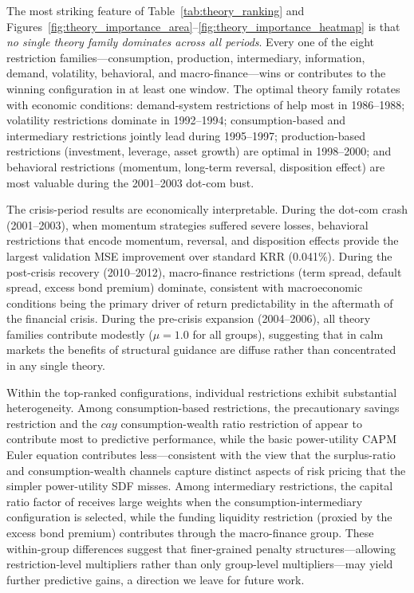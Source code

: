 The most striking feature of Table~\ref{tab:theory_ranking} and Figures~\ref{fig:theory_importance_area}--\ref{fig:theory_importance_heatmap} is that \emph{no single theory family dominates across all periods}.
Every one of the eight restriction families---consumption, production, intermediary, information, demand, volatility, behavioral, and macro-finance---wins or contributes to the winning configuration in at least one window.
The optimal theory family rotates with economic conditions: demand-system restrictions of \citet{koijenyogo2019} help most in 1986--1988; volatility restrictions dominate in 1992--1994; consumption-based and intermediary restrictions jointly lead during 1995--1997; production-based restrictions (investment, leverage, asset growth) are optimal in 1998--2000; and behavioral restrictions (momentum, long-term reversal, disposition effect) are most valuable during the 2001--2003 dot-com bust.

The crisis-period results are economically interpretable.
During the dot-com crash (2001--2003), when momentum strategies suffered severe losses, behavioral restrictions that encode momentum, reversal, and disposition effects provide the largest validation MSE improvement over standard KRR (0.041\%).
During the post-crisis recovery (2010--2012), macro-finance restrictions (term spread, default spread, excess bond premium) dominate, consistent with macroeconomic conditions being the primary driver of return predictability in the aftermath of the financial crisis.
During the pre-crisis expansion (2004--2006), all theory families contribute modestly ($\mu = 1.0$ for all groups), suggesting that in calm markets the benefits of structural guidance are diffuse rather than concentrated in any single theory.

Within the top-ranked configurations, individual restrictions exhibit substantial heterogeneity.
Among consumption-based restrictions, the precautionary savings restriction and the $cay$ consumption-wealth ratio restriction of \citet{lettauludvigson2001} appear to contribute most to predictive performance, while the basic power-utility CAPM Euler equation contributes less---consistent with the view that the surplus-ratio and consumption-wealth channels capture distinct aspects of risk pricing that the simpler power-utility SDF misses.
Among intermediary restrictions, the capital ratio factor of \citet{hekrishnamurthy2013} receives large weights when the consumption-intermediary configuration is selected, while the funding liquidity restriction (proxied by the excess bond premium) contributes through the macro-finance group.
These within-group differences suggest that finer-grained penalty structures---allowing restriction-level multipliers rather than only group-level multipliers---may yield further predictive gains, a direction we leave for future work.

